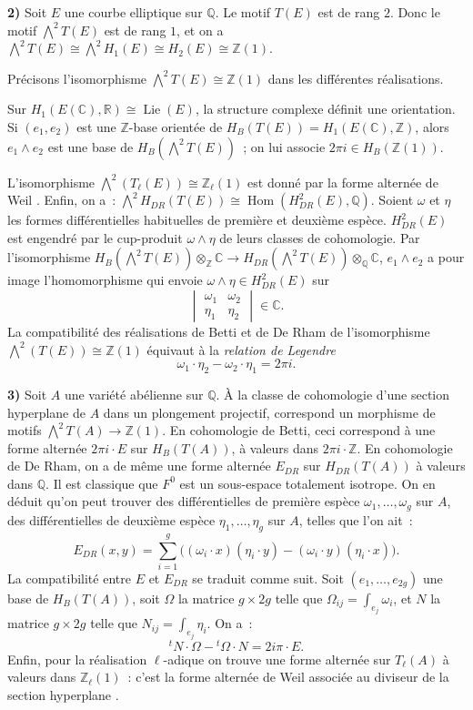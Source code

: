 \documentclass[12pt,a4paper]{article}
\theoremstyle{plain}
\theoremstyle{definition}
\theoremstyle{remark}
\DeclareMathOperator{\Lie}{Lie}
\newcommand{\ZZ}{\mathbb{Z}}
\newcommand{\QQ}{\mathbb{Q}}
\newcommand{\CC}{\mathbb{C}}
\newcommand{\RR}{\mathbb{R}}
\providecommand{\CC}{\mathbb{C}}
\providecommand{\QQ}{\mathbb{Q}}
\providecommand{\RR}{\mathbb{R}}
\providecommand{\ZZ}{\mathbb{Z}}
\providecommand{\Hom}{\operatorname{Hom}}
\providecommand{\Lie}{\operatorname{Lie}}
\begin{document}
\textbf{2)} Soit $E$ une courbe elliptique sur $\QQ$. Le motif $T(E)$ est de rang $2$. Donc le motif $\bigwedge^2 T(E)$ est de rang $1$, et on a $\bigwedge^2 T(E) \cong \bigwedge^2 H_1(E) \cong H_2(E) \cong \ZZ(1)$.

Précisons l'isomorphisme $\bigwedge^2 T(E) \cong \ZZ(1)$ dans les différentes réalisations.

Sur $H_1(E(\CC), \RR) \cong \Lie(E)$, la structure complexe définit une orientation. Si $(e_1, e_2)$ est une $\ZZ$-base orientée de $H_B(T(E)) = H_1(E(\CC), \ZZ)$, alors $e_1 \wedge e_2$ est une base de $H_B(\bigwedge^2 T(E))$~; on lui associe $2\pi i \in H_B(\ZZ(1))$.

L'isomorphisme $\bigwedge^2(T_\ell(E)) \cong \ZZ_\ell(1)$ est donné par la forme alternée de Weil \cite{Weil1}. Enfin, on a~: $\bigwedge^2 H_{DR}(T(E)) \cong \Hom(H^2_{DR}(E), \QQ)$. Soient $\omega$ et $\eta$ les formes différentielles habituelles de première et deuxième espèce. $H^2_{DR}(E)$ est engendré par le cup-produit $\omega \wedge \eta$ de leurs classes de cohomologie. Par l'isomorphisme $H_B(\bigwedge^2 T(E)) \otimes_\ZZ \CC \to H_{DR}(\bigwedge^2 T(E)) \otimes_\QQ \CC$, $e_1 \wedge e_2$ a pour image l'homomorphisme qui envoie $\omega \wedge \eta \in H^2_{DR}(E)$ sur
\[
\begin{vmatrix}
\omega_1 & \omega_2 \\
\eta_1 & \eta_2
\end{vmatrix}
\in \CC.
\]
La compatibilité des réalisations de Betti et de De Rham de l'isomorphisme $\bigwedge^2(T(E)) \cong \ZZ(1)$ équivaut à la \emph{relation de Legendre}
\[
\omega_1 \cdot \eta_2 - \omega_2 \cdot \eta_1 = 2\pi i.
\]

\textbf{3)} Soit $A$ une variété abélienne sur $\QQ$. À la classe de cohomologie d'une section hyperplane de $A$ dans un plongement projectif, correspond un morphisme de motifs $\bigwedge^2 T(A) \to \ZZ(1)$. En cohomologie de Betti, ceci correspond à une forme alternée $2\pi i \cdot E$ sur $H_B(T(A))$, à valeurs dans $2\pi i \cdot \ZZ$. En cohomologie de De Rham, on a de même une forme alternée $E_{DR}$ sur $H_{DR}(T(A))$ à valeurs dans $\QQ$. Il est classique que $F^0$ est un sous-espace totalement isotrope. On en déduit qu'on peut trouver des différentielles de première espèce $\omega_1, \ldots, \omega_g$ sur $A$, des différentielles de deuxième espèce $\eta_1, \ldots, \eta_g$ sur $A$, telles que l'on ait~:
\[
E_{DR}(x, y) = \sum_{i=1}^{g} \bigl((\omega_i \cdot x)(\eta_i \cdot y) - (\omega_i \cdot y)(\eta_i \cdot x)\bigr).
\]
La compatibilité entre $E$ et $E_{DR}$ se traduit comme suit. Soit $(e_1, \ldots, e_{2g})$ une base de $H_B(T(A))$, soit $\Omega$ la matrice $g \times 2g$ telle que $\Omega_{ij} = \int_{e_j} \omega_i$, et $N$ la matrice $g \times 2g$ telle que $N_{ij} = \int_{e_j} \eta_i$. On a~:
\[
{}^t\!N \cdot \Omega - {}^t\!\Omega \cdot N = 2i\pi \cdot E.
\]
Enfin, pour la réalisation $\ell$-adique on trouve une forme alternée sur $T_\ell(A)$ à valeurs dans $\ZZ_\ell(1)$~: c'est la forme alternée de Weil associée au diviseur de la section hyperplane \cite{Weil1}.
\end{document}
